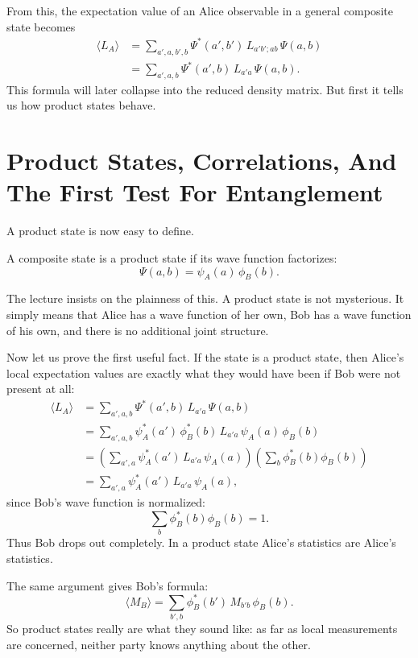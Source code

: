 From this, the expectation value of an Alice observable in a general composite state becomes
\begin{align}
\langle L_A\rangle
&=
\sum_{a',a,b',b}
\Psi^*(a',b')\,
L_{a'b';ab}\,
\Psi(a,b) \\
&=
\sum_{a',a,b}
\Psi^*(a',b)\,
L_{a'a}\,
\Psi(a,b).
\end{align}
This formula will later collapse into the reduced density matrix. But first it tells us how product states behave.

\section{Product States, Correlations, And The First Test For Entanglement}

A product state is now easy to define.

\begin{definition}
A composite state is a product state if its wave function factorizes:
\begin{equation}
\Psi(a,b)=\psi_A(a)\,\phi_B(b).
\end{equation}
\end{definition}

The lecture insists on the plainness of this. A product state is not mysterious. It simply means that Alice has a wave function of her own, Bob has a wave function of his own, and there is no additional joint structure.

Now let us prove the first useful fact. If the state is a product state, then Alice's local expectation values are exactly what they would have been if Bob were not present at all:
\begin{align}
\langle L_A\rangle
&=
\sum_{a',a,b}
\Psi^*(a',b)\,
L_{a'a}\,
\Psi(a,b) \\
&=
\sum_{a',a,b}
\psi_A^*(a')\,\phi_B^*(b)\,
L_{a'a}\,
\psi_A(a)\,\phi_B(b) \\
&=
\left(
\sum_{a',a}\psi_A^*(a')\,L_{a'a}\,\psi_A(a)
\right)
\left(
\sum_b \phi_B^*(b)\phi_B(b)
\right) \\
&=
\sum_{a',a}\psi_A^*(a')\,L_{a'a}\,\psi_A(a),
\end{align}
since Bob's wave function is normalized:
\[
\sum_b \phi_B^*(b)\phi_B(b)=1.
\]
Thus Bob drops out completely. In a product state Alice's statistics are Alice's statistics.

The same argument gives Bob's formula:
\begin{equation}
\langle M_B\rangle
=
\sum_{b',b}\phi_B^*(b')\,M_{b'b}\,\phi_B(b).
\end{equation}
So product states really are what they sound like: as far as local measurements are concerned, neither party knows anything about the other.

